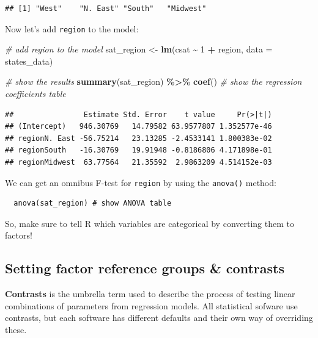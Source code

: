 \documentclass[
]{book}
\newenvironment{Shaded}{\begin{snugshade}}{\end{snugshade}}
\newcommand{\CommentTok}[1]{\textcolor[rgb]{0.56,0.35,0.01}{\textit{#1}}}
\newcommand{\DataTypeTok}[1]{\textcolor[rgb]{0.13,0.29,0.53}{#1}}
\newcommand{\DecValTok}[1]{\textcolor[rgb]{0.00,0.00,0.81}{#1}}
\newcommand{\KeywordTok}[1]{\textcolor[rgb]{0.13,0.29,0.53}{\textbf{#1}}}
\newcommand{\NormalTok}[1]{#1}
\newcommand{\OperatorTok}[1]{\textcolor[rgb]{0.81,0.36,0.00}{\textbf{#1}}}
\newcommand{\StringTok}[1]{\textcolor[rgb]{0.31,0.60,0.02}{#1}}
\begin{document}
\begin{verbatim}
## [1] "West"    "N. East" "South"   "Midwest"
\end{verbatim}

Now let's add \texttt{region} to the model:

\begin{Shaded}
\begin{Highlighting}[]
  \CommentTok{\# add region to the model}
\NormalTok{  sat\_region \textless{}{-}}\StringTok{ }\KeywordTok{lm}\NormalTok{(csat }\OperatorTok{\textasciitilde{}}\StringTok{ }\DecValTok{1} \OperatorTok{+}\StringTok{ }\NormalTok{region, }\DataTypeTok{data =}\NormalTok{ states\_data) }

  \CommentTok{\# show the results}
  \KeywordTok{summary}\NormalTok{(sat\_region) }\OperatorTok{\%\textgreater{}\%}\StringTok{ }\KeywordTok{coef}\NormalTok{() }\CommentTok{\# show the regression coefficients table}
\end{Highlighting}
\end{Shaded}

\begin{verbatim}
##                Estimate Std. Error    t value     Pr(>|t|)
## (Intercept)   946.30769   14.79582 63.9577807 1.352577e-46
## regionN. East -56.75214   23.13285 -2.4533141 1.800383e-02
## regionSouth   -16.30769   19.91948 -0.8186806 4.171898e-01
## regionMidwest  63.77564   21.35592  2.9863209 4.514152e-03
\end{verbatim}

We can get an omnibus F-test for \texttt{region} by using the \texttt{anova()} method:

\begin{verbatim}
  anova(sat_region) # show ANOVA table
\end{verbatim}

So, make sure to tell R which variables are categorical by converting them to factors!

\hypertarget{setting-factor-reference-groups-contrasts}{%
\subsection{Setting factor reference groups \& contrasts}\label{setting-factor-reference-groups-contrasts}}

\textbf{Contrasts} is the umbrella term used to describe the process of testing linear combinations of parameters from regression models. All statistical sofware use contrasts, but each software has different defaults and their own way of overriding these.
\end{document}
